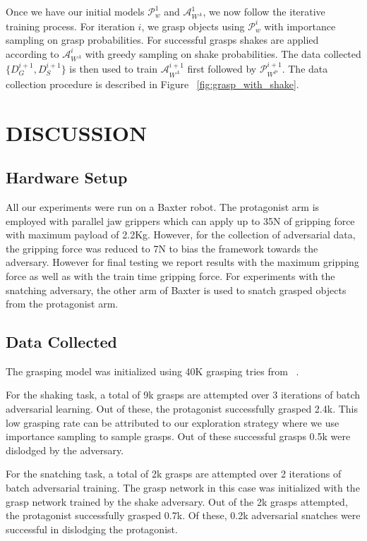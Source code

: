 \documentclass[letterpaper, 10 pt, conference]{ieeeconf}  %
\begin{document}
Once we have our initial models $\mathcal{P}^{1}_{w}$ and $\mathcal{A}^{1}_{W^A}$, we now follow the iterative training process. For iteration $i$, we grasp objects using $\mathcal{P}^{i}_{w}$ with importance sampling on grasp probabilities. For successful grasps shakes are applied according to $\mathcal{A}^{i}_{W^A}$ with greedy sampling on shake probabilities. The data collected $\{D^{i+1}_G,D^{i+1}_S\}$ is then used to train $\mathcal{A}^{i+1}_{W^A}$ first followed by $\mathcal{P}^{i+1}_{W^P}$.
The data collection procedure is described in Figure ~\ref{fig:grasp_with_shake}.


\section{DISCUSSION}\subsection{Hardware Setup}
All our experiments were run on a Baxter robot. The protagonist arm is employed with parallel jaw grippers which can apply up to 35N of gripping force with maximum payload of 2.2Kg. However, for the collection of adversarial data, the gripping force was reduced to 7N to bias the framework towards the adversary. However for final testing we report results with the maximum gripping force as well as with the train time gripping force. For experiments with the snatching adversary, the other arm of Baxter is used to snatch grasped objects from the protagonist arm.

\subsection{Data Collected}
The grasping model was initialized using 40K grasping tries from   ~\cite{pinto2016supersizing}. 

For the shaking task, a total of 9k grasps are attempted over 3 iterations of batch adversarial learning. Out of these, the protagonist successfully grasped 2.4k. This low grasping rate can be attributed to our exploration strategy where we use importance sampling to sample grasps. Out of these successful grasps 0.5k were dislodged by the adversary.

For the snatching task, a total of 2k grasps are attempted over 2 iterations of batch adversarial training. The grasp network in this case was initialized with the grasp network trained by the shake adversary. Out of the 2k grasps attempted, the protagonist successfully grasped 0.7k. Of these, 0.2k adversarial snatches were successful in dislodging the protagonist.
\end{document}
